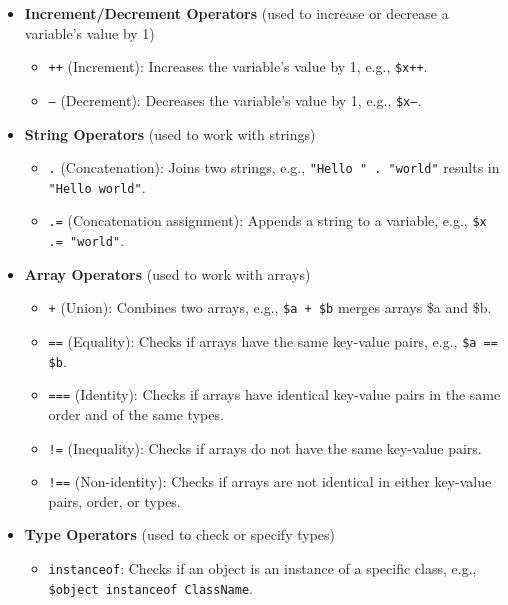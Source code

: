 \documentclass{report}
\begin{document}
\begin{itemize}
\begin{itemize}
                \item \textbf{Increment/Decrement Operators} (used to increase or decrease a variable's value by 1)
                    \begin{itemize}
                        \item \texttt{++} (Increment): Increases the variable's value by 1, e.g., \texttt{\$x++}.
                        \item \texttt{--} (Decrement): Decreases the variable's value by 1, e.g., \texttt{\$x--}.
                    \end{itemize}

                \item \textbf{String Operators} (used to work with strings)
                    \begin{itemize}
                        \item \texttt{.} (Concatenation): Joins two strings, e.g., \texttt{"Hello " . "world"} results in \texttt{"Hello world"}.
                        \item \texttt{.=} (Concatenation assignment): Appends a string to a variable, e.g., \texttt{\$x .= "world"}.
                    \end{itemize}

                \item \textbf{Array Operators} (used to work with arrays)
                    \begin{itemize}
                        \item \texttt{+} (Union): Combines two arrays, e.g., \texttt{\$a + \$b} merges arrays \$a and \$b.
                        \item \texttt{==} (Equality): Checks if arrays have the same key-value pairs, e.g., \texttt{\$a == \$b}.
                        \item \texttt{===} (Identity): Checks if arrays have identical key-value pairs in the same order and of the same types.
                        \item \texttt{!=} (Inequality): Checks if arrays do not have the same key-value pairs.
                        \item \texttt{!==} (Non-identity): Checks if arrays are not identical in either key-value pairs, order, or types.
                    \end{itemize}

                \item \textbf{Type Operators} (used to check or specify types)
                    \begin{itemize}
                        \item \texttt{instanceof}: Checks if an object is an instance of a specific class, e.g., \texttt{\$object instanceof ClassName}.
                    \end{itemize}


\end{itemize}
\end{itemize}
\end{document}
